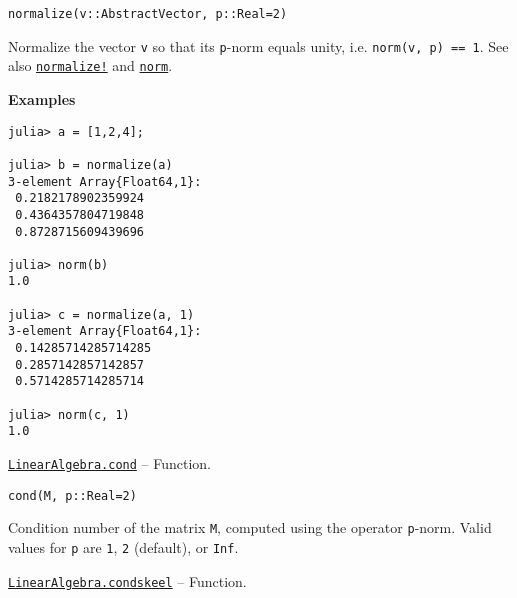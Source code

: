 \begin{adjustwidth}{2em}{0pt}


\begin{verbatim}
normalize(v::AbstractVector, p::Real=2)
\end{verbatim}

Normalize the vector \texttt{v} so that its \texttt{p}-norm equals unity, i.e. \texttt{norm(v, p) == 1}. See also \hyperlink{7806117778219468080}{\texttt{normalize!}} and \hyperlink{898926013064269707}{\texttt{norm}}.

\textbf{Examples}


\begin{verbatim}
julia> a = [1,2,4];

julia> b = normalize(a)
3-element Array{Float64,1}:
 0.2182178902359924
 0.4364357804719848
 0.8728715609439696

julia> norm(b)
1.0

julia> c = normalize(a, 1)
3-element Array{Float64,1}:
 0.14285714285714285
 0.2857142857142857
 0.5714285714285714

julia> norm(c, 1)
1.0
\end{verbatim}



\end{adjustwidth}
\hypertarget{875685967830602736}{} 
\hyperlink{875685967830602736}{\texttt{LinearAlgebra.cond}}  -- {Function.}

\begin{adjustwidth}{2em}{0pt}


\begin{verbatim}
cond(M, p::Real=2)
\end{verbatim}

Condition number of the matrix \texttt{M}, computed using the operator \texttt{p}-norm. Valid values for \texttt{p} are \texttt{1}, \texttt{2} (default), or \texttt{Inf}.



\end{adjustwidth}
\hypertarget{11563712892597655531}{} 
\hyperlink{11563712892597655531}{\texttt{LinearAlgebra.condskeel}}  -- {Function.}

